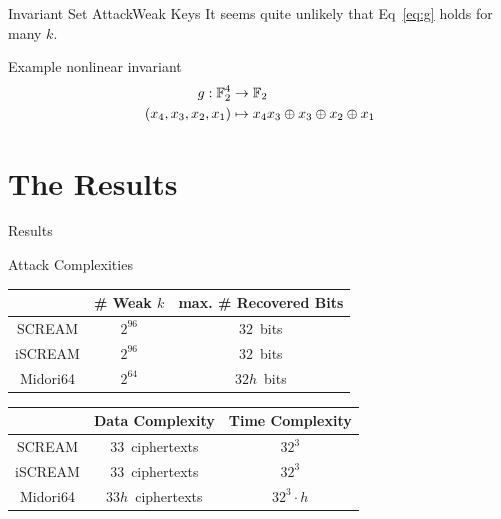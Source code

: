 \begin{frame}{Invariant Set Attack}{Weak Keys}
    It seems quite unlikely that Eq~\eqref{eq:g} holds for many $k$.
    \begin{block}{Example nonlinear invariant}
        \vspace{-2em}
        \begin{align*}
            g : \mathbb{F}_2^4 &\to \mathbb{F}_2 \\
            (x_4, x_3, x_2, x_1) &\mapsto x_4 x_3 \oplus x_3 \oplus x_2 \oplus x_1
        \end{align*}
        \vspace{-2em}
    \end{block}
\end{frame}

\section{The Results}
\begin{frame}{Results}{}
    \begin{block}{Attack Complexities}
        \centering
        \begin{tabular}{ccc}
            \toprule
                   & \# Weak $k$ & max. \# Recovered Bits \\
            \midrule
             SCREAM &  $2^{96} $  &       $32$~bits  \\
            iSCREAM &  $2^{96} $  &       $32$~bits  \\
           Midori64 &  $2^{64} $  &      $32h$~bits  \\
            \bottomrule
        \end{tabular}

        \begin{tabular}{ccc}
            \toprule
                   & Data Complexity & Time Complexity \\
            \midrule
             SCREAM &  $33$~ciphertexts  & $32^3$  \\
            iSCREAM &  $33$~ciphertexts  & $32^3$  \\
           Midori64 &  $33h$~ciphertexts & $32^3 \cdot h$  \\
            \bottomrule
        \end{tabular}
    \end{block}
\end{frame}
